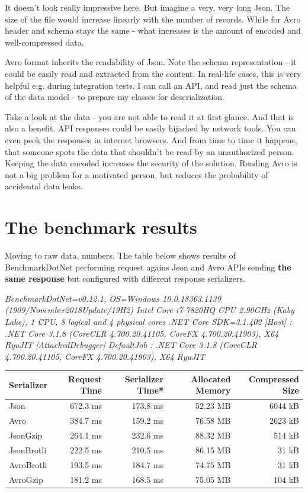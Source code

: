 \documentclass[]{article}
\begin{document}
It doesn't look really impressive here. But imagine a very, very long Json. The size of the file would increase linearly with the number of records. While for Avro header and schema stays the same - what increases is the amount of encoded and well-compressed data.

Avro format inherits the readability of Json. Note the schema representation - it could be easily read and extracted from the content. In real-life cases, this is very helpful e.g. during integration tests. I can call an API, and read just the schema of the data model - to prepare my classes for deserialization.

Take a look at the data - you are not able to read it at first glance. And that is also a benefit. API responses could be easily hijacked by network tools. You can even peek the responses in internet browsers. And from time to time it happens, that someone spots the data that shouldn't be read by an unauthorized person. Keeping the data encoded increases the security of the solution. Reading Avro is not a big problem for a motivated person, but reduces the probability of accidental data leaks.



\section{The benchmark results}

Moving to raw data, numbers. The table below shows results of BenchmarkDotNet performing request agains Json and Avro APIs sending \textbf{the same response} but configured with different response serializers.
\medskip

{\tiny
\emph{
BenchmarkDotNet=v0.12.1, OS=Windows 10.0.18363.1139 (1909/November2018Update/19H2)
Intel Core i7-7820HQ CPU 2.90GHz (Kaby Lake), 1 CPU, 8 logical and 4 physical cores
.NET Core SDK=3.1.402
  [Host]     : .NET Core 3.1.8 (CoreCLR 4.700.20.41105, CoreFX 4.700.20.41903), X64 RyuJIT  [AttachedDebugger]
  DefaultJob : .NET Core 3.1.8 (CoreCLR 4.700.20.41105, CoreFX 4.700.20.41903), X64 RyuJIT
}
}

\begin{center}
 \begin{tabular}{||l r r r r ||} 
 \hline
 Serializer & Request Time & Serializer Time* & Allocated Memory & Compressed Size \\ [0.5ex] 
 \hline\hline
 Json          &	672.3 ms & 173.8 ms &	52.23 MB &	6044 kB \\ 
 \hline
 Avro          &	384.7 ms & 159.2 ms &	76.58 MB &	2623 kB \\
 \hline
 JsonGzip      &	264.1 ms & 232.6 ms &	88.32 MB &	514 kB \\
 \hline
 JsonBrotli	   &	222.5 ms & 210.5 ms &	86.15 MB &	31 kB \\ 
 \hline
  AvroBrotli   &	193.5 ms & 184.7 ms &   74.75 MB & 31 kB \\
 \hline
  AvroGzip      &	181.2 ms & 168.5 ms &	75.05 MB &	104 kB \\
 \hline
\end{tabular}
\end{center}
\end{document}
